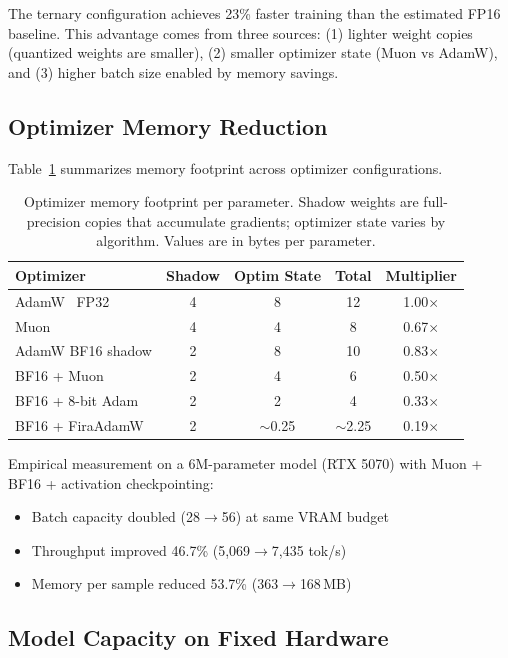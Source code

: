 \documentclass{article}
\begin{document}
The ternary configuration achieves 23\% faster training than the estimated FP16 baseline. This advantage comes from three sources: (1) lighter weight copies (quantized weights are smaller), (2) smaller optimizer state (Muon vs AdamW), and (3) higher batch size enabled by memory savings.

\subsection{Optimizer Memory Reduction}

Table~\ref{tab:optim_memory} summarizes memory footprint across optimizer configurations.

\begin{table}[t]
\centering
\small
\caption{Optimizer memory footprint per parameter. Shadow weights are full-precision copies that accumulate gradients; optimizer state varies by algorithm. Values are in bytes per parameter.}
\label{tab:optim_memory}
\begin{tabular}{lcccc}
\toprule
\textbf{Optimizer} & \textbf{Shadow} & \textbf{Optim State} & \textbf{Total} & \textbf{Multiplier} \\
\midrule
AdamW~\citep{loshchilov2019decoupled} FP32 & 4 & 8 & 12 & 1.00$\times$ \\
Muon~\citep{jordan2024muon} & 4 & 4 & 8 & 0.67$\times$ \\
AdamW BF16 shadow & 2 & 8 & 10 & 0.83$\times$ \\
BF16 + Muon & 2 & 4 & 6 & 0.50$\times$ \\
BF16 + 8-bit Adam~\citep{dettmers2022bitsandbytes} & 2 & 2 & 4 & 0.33$\times$ \\
BF16 + FiraAdamW~\citep{fira2025} & 2 & $\sim$0.25 & $\sim$2.25 & 0.19$\times$ \\
\bottomrule
\end{tabular}
\end{table}

Empirical measurement on a 6M-parameter model (RTX 5070) with Muon + BF16 + activation checkpointing:
\begin{itemize}
\item Batch capacity doubled (28$\to$56) at same VRAM budget
\item Throughput improved 46.7\% (5{,}069$\to$7{,}435 tok/s)
\item Memory per sample reduced 53.7\% (363$\to$168\,MB)
\end{itemize}

\subsection{Model Capacity on Fixed Hardware}
\end{document}
